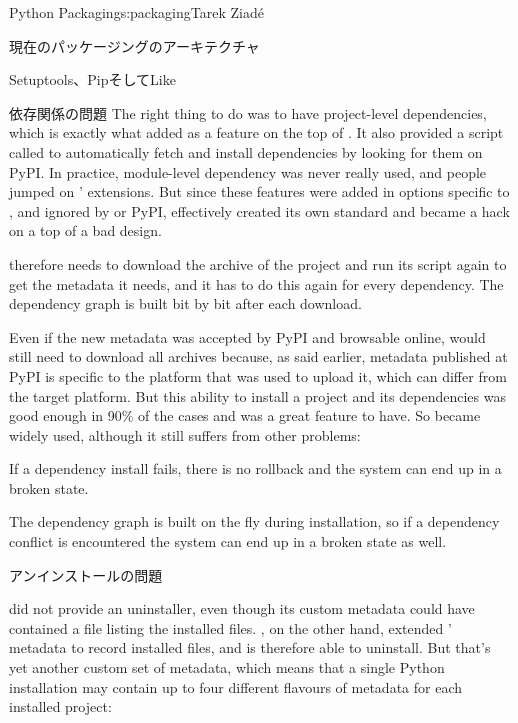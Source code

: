 \begin{aosachapter}{Python Packaging}{s:packaging}{Tarek Ziad\'{e}}
\begin{aosasect1}{現在のパッケージングのアーキテクチャ}
\begin{aosasect2}{Setuptools、PipそしてLike}
\begin{aosasect3}{依存関係の問題}
The right thing to do was to have project-level dependencies, which is
exactly what  added as a feature on the top of
.  It also provided a script called
 to automatically fetch and install dependencies
by looking for them on PyPI\@.  In practice, module-level dependency was
never really used, and people jumped on ' extensions.
But since these features were added in options specific to
, and ignored by  or PyPI,
 effectively created its own standard and became a
hack on a top of a bad design.

 therefore needs to download the archive of the
project and run its  script again to get the metadata
it needs, and it has to do this again for every dependency. The
dependency graph is built bit by bit after each download.

Even if the new metadata was accepted by PyPI and browsable online,
 would still need to download all archives
because, as said earlier, metadata published at PyPI is specific to
the platform that was used to upload it, which can differ from the
target platform.  But this ability to install a project and its
dependencies was good enough in 90\% of the cases and was a great
feature to have. So  became widely used, although it
still suffers from other problems:

\begin{aosaitemize}

  \item If a dependency install fails, there is no rollback and the
  system can end up in a broken state.

  \item The dependency graph is built on the fly during installation, so
  if a dependency conflict is encountered the system can end up in a
  broken state as well.

\end{aosaitemize}

\end{aosasect3}

\begin{aosasect3}{アンインストールの問題}

 did not provide an uninstaller, even though its
custom metadata could have contained a file listing the installed
files.  , on the other hand, extended '
metadata to record installed files, and is therefore able to
uninstall.  But that's yet another custom set of metadata, which means
that a single Python installation may contain up to four different
flavours of metadata for each installed project:


\end{aosasect3}
\end{aosasect2}
\end{aosasect1}
\end{aosachapter}

